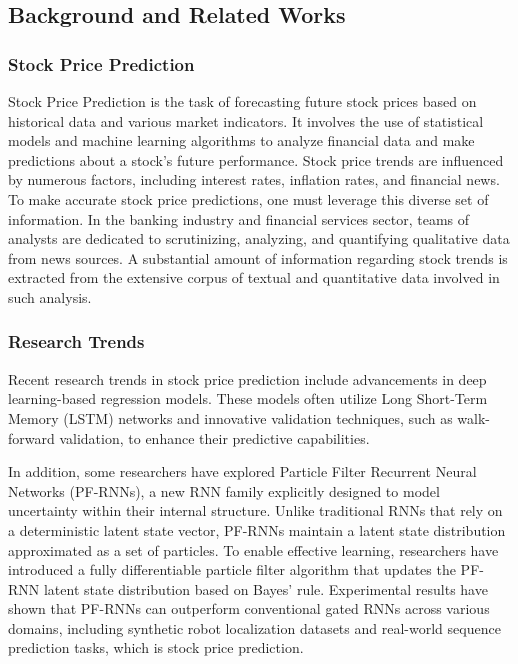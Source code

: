 \subsection{Background and Related Works}

\subsubsection{Stock Price Prediction}
Stock Price Prediction is the task of forecasting future stock prices based on historical data and various market indicators. 
It involves the use of statistical models and machine learning algorithms to analyze financial data and make predictions about a stock's future performance. 
Stock price trends are influenced by numerous factors, including interest rates, inflation rates, and financial news. 
To make accurate stock price predictions, one must leverage this diverse set of information. 
In the banking industry and financial services sector, teams of analysts are dedicated to scrutinizing, analyzing, and quantifying qualitative data from news sources. 
A substantial amount of information regarding stock trends is extracted from the extensive corpus of textual and quantitative data involved in such analysis.

\subsubsection{Research Trends}
Recent research trends in stock price prediction include advancements in deep learning-based regression models. \cite{li2019dp}
These models often utilize Long Short-Term Memory (LSTM) networks and innovative validation techniques, such as walk-forward validation, to enhance their predictive capabilities.

In addition, some researchers have explored Particle Filter Recurrent Neural Networks (PF-RNNs), a new RNN family explicitly designed to model uncertainty within their internal structure. \cite{ma2020particle}
Unlike traditional RNNs that rely on a deterministic latent state vector, PF-RNNs maintain a latent state distribution approximated as a set of particles. 
To enable effective learning, researchers have introduced a fully differentiable particle filter algorithm that updates the PF-RNN latent state distribution based on Bayes' rule. 
Experimental results have shown that PF-RNNs can outperform conventional gated RNNs across various domains, 
including synthetic robot localization datasets and real-world sequence prediction tasks, which is stock price prediction.

